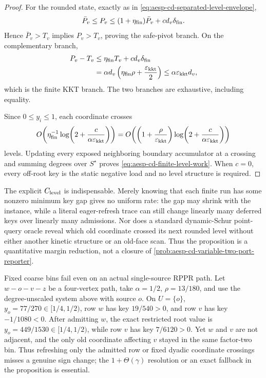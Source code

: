 \begin{proof}
For the rounded state, exactly as in
\cref{eq:aesp-cd-separated-level-envelope},
\begin{equation*}
 \bar P_v\leq P_v
 \leq(1+\eta_{\rm fin})\bar P_v+c d_v\delta_{\rm fin}.
\end{equation*}
Hence \(\bar P_v>T_v\) implies \(P_v>T_v\), proving the safe-pivot
branch.  On the complementary branch,
\begin{align*}
 P_v-T_v
 &\leq\eta_{\rm fin}T_v+c d_v\delta_{\rm fin}\\
 &=\alpha d_v\left(
     \eta_{\rm fin}\rho+\frac{\varepsilon_{\mathrm{kkt}}}{2}
   \right)
 \leq\alpha\varepsilon_{\mathrm{kkt}} d_v,
\end{align*}
which is the finite KKT branch.  The two branches are exhaustive, including
equality.

Since \(0\leq y_i\leq1\), each coordinate crosses
\begin{equation*}
 O\!\left(
  \eta_{\rm fin}^{-1}
  \log\!\left(2+\frac{c}{\alpha\varepsilon_{\mathrm{kkt}}}\right)
 \right)
 =O\!\left(
  \left(1+\frac\rho{\varepsilon_{\mathrm{kkt}}}\right)
  \log\!\left(2+\frac{c}{\alpha\varepsilon_{\mathrm{kkt}}}\right)
 \right)
\end{equation*}
levels.  Updating every exposed neighboring boundary accumulator at a
crossing and summing degrees over \(S^\star\) proves
\cref{eq:aesp-cd-finite-level-work}.  When \(c=0\), every off-root key is
the static negative load and no level structure is required.
\end{proof}

The explicit $C_{\rm level}$ is indispensable.  Merely knowing that each
finite run has some nonzero minimum key gap gives no uniform rate: the gap
may shrink with the instance, while a literal eager-refresh trace can still
change linearly many deferred keys over linearly many admissions.  Nor does a
standard dynamic-Schur point-query oracle reveal which old coordinate crossed
its next rounded level without either another kinetic structure or an old-face
scan.  Thus the proposition is a quantitative margin reduction, not a closure
of \cref{prob:aesp-cd-variable-two-port-reporter}.

Fixed coarse bins fail even on an actual single-source RPPR path.  Let
$w-o-v-z$ be a four-vertex path, take $\alpha=1/2$, $\rho=13/180$, and use
the degree-unscaled system above with source $o$.  On $U=\{o\}$,
$y_o=77/270\in[1/4,1/2)$, row $w$ has key $19/540>0$, and row $v$ has key
$-1/1080<0$.  After admitting $w$, the exact restricted root value is
$y_o=449/1530\in[1/4,1/2)$, while row $v$ has key $7/6120>0$.  Yet $w$ and
$v$ are not adjacent, and the only old coordinate affecting $v$ stayed in
the same factor-two bin.  Thus refreshing only the admitted row or fixed
dyadic coordinate crossings misses a genuine sign change; the
$1+\Theta(\gamma)$ resolution or an exact fallback in the proposition is
essential.

